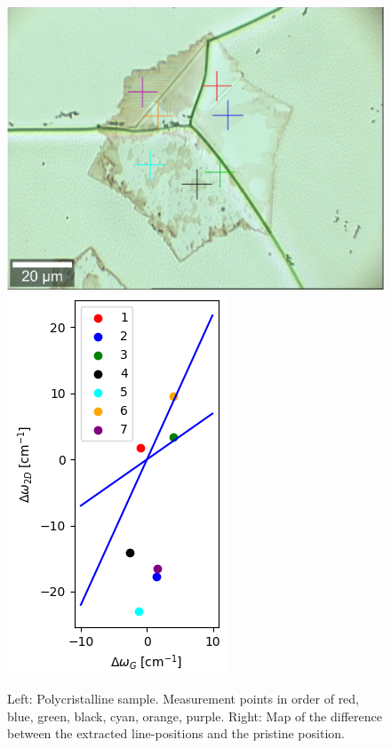 \documentclass[12pt,a4paper]{article}
\begin{document}
\begin{figure}
\centering
\includegraphics[scale=0.3]{Bilder/part6/4D4RamanFlake.png}
\includegraphics[scale=0.7]{Bilder/part6/map.png}
\caption{Left: Polycristalline sample. Measurement points in order of red, blue, green, black, cyan, orange, purple. Right: Map of the difference between the extracted line-positions and the pristine position.}
\label{fig:poly_sample}
\end{figure}
\end{document}
